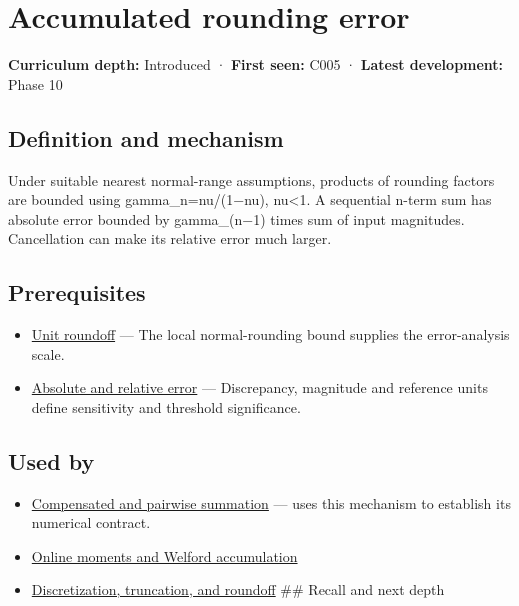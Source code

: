 \hypertarget{appendix-f82e270791c8}{}\label{referencestart:appendix-f82e270791c8}
\section{Accumulated rounding error}\label{appendix-f82e270791c8-accumulated-rounding-error}

\textbf{Curriculum depth:} Introduced · \textbf{First seen:} C005 · \textbf{Latest development:} Phase 10

\subsection{Definition and mechanism}\label{appendix-f82e270791c8-definition-and-mechanism}

Under suitable nearest normal-range assumptions, products of rounding factors are bounded using gamma\_n=nu/(1−nu), nu\textless1. A sequential n-term sum has absolute error bounded by gamma\_(n−1) times sum of input magnitudes. Cancellation can make its relative error much larger.

\subsection{Prerequisites}\label{appendix-f82e270791c8-prerequisites}

\begin{itemize}
\tightlist
\item
  \hyperref[appendix-bc44f7b42f42]{Unit roundoff} --- The local normal-rounding bound supplies the error-analysis scale.
\item
  \hyperref[appendix-3ae74e89b4e6]{Absolute and relative error} --- Discrepancy, magnitude and reference units define sensitivity and threshold significance.
\end{itemize}

\subsection{Used by}\label{appendix-f82e270791c8-used-by}

\begin{itemize}
\item
  \hyperref[appendix-df318da57389]{Compensated and pairwise summation} --- uses this mechanism to establish its numerical contract.
\item
  \hyperref[appendix-33237f0f618b]{Online moments and Welford accumulation}
\item
  \hyperref[appendix-6b0648b2b8e8]{Discretization, truncation, and roundoff} \#\# Recall and next depth
\end{itemize}

